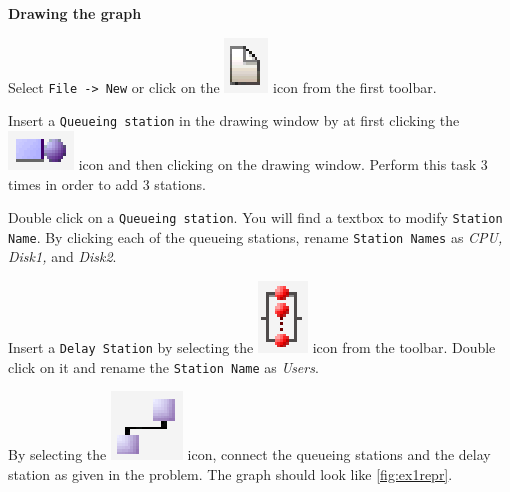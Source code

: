 \noindent \textbf{Drawing the graph}
\begin{itemize*}
\item  Select \texttt{File -> New} or click on the
\includegraphics[scale=.5]{img/jsimg/new.eps} icon from
the first toolbar. \item Insert a \texttt{Queueing station} in the
drawing window by at first clicking the
\includegraphics[scale=.5]{img/jsimg/insertServer} icon and then clicking
on the drawing window. Perform this task 3 times in order to add 3
stations. \item Double click on a \texttt{Queueing station}. You
will find a textbox to modify \texttt{Station Name}. By clicking
each of the queueing stations, rename \texttt{Station Names} as
\emph{CPU, Disk1,} and \emph{Disk2}. \item Insert a \texttt{Delay
Station} by selecting the
\includegraphics[scale=.5]{img/jsimg/insertDelay} icon from
the toolbar. Double click on it and rename the \texttt{Station
Name} as \emph{Users}. \item By selecting the
\includegraphics[scale=.5]{img/jsimg/connect} icon, connect
the queueing stations and the delay station as given in the
problem. The graph should look like \autoref{fig:ex1repr}.
\end{itemize*}
